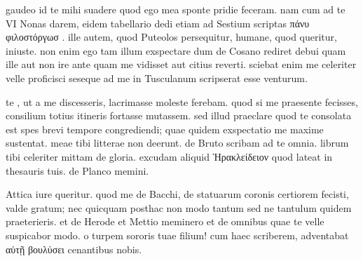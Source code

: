 


 gaudeo id te mihi suadere quod ego mea sponte pridie feceram. nam cum ad te VI Nonas darem, eidem tabellario dedi etiam ad Sestium scriptas πάνυ φιλοστόργωσ . ille autem, quod Puteolos persequitur, humane, quod queritur, iniuste. non enim ego tam illum exspectare dum de Cosano rediret debui quam ille aut non ire ante quam me vidisset aut citius reverti. sciebat enim me celeriter velle proficisci seseque ad me in Tusculanum scripserat esse venturum.

 te , ut a me discesseris, lacrimasse moleste ferebam. quod si me praesente fecisses, consilium totius itineris fortasse mutassem. sed illud praeclare quod te consolata est spes brevi tempore congrediendi; quae quidem exspectatio me maxime sustentat. meae tibi litterae non deerunt. de Bruto scribam ad te omnia. librum tibi celeriter mittam de gloria. excudam aliquid Ἡρακλείδειον quod lateat in thesauris tuis. de Planco memini.

 Attica iure queritur. quod me de Bacchi, de statuarum coronis certiorem fecisti, valde gratum; nec quicquam posthac non modo tantum sed ne tantulum quidem praeterieris. et de Herode et Mettio meminero et de omnibus quae te velle suspicabor modo. o turpem sororis tuae filium! cum haec scriberem, adventabat αὐτῇ βουλύσει cenantibus nobis.
